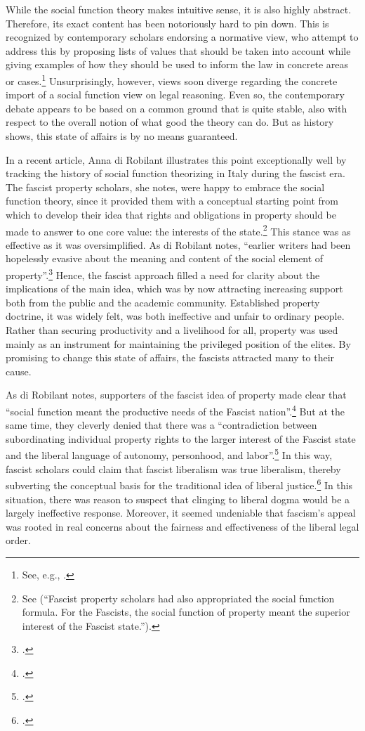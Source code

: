 While the social function theory makes intuitive sense, it is also highly abstract. Therefore, its exact content has been notoriously hard to pin down. This is recognized by contemporary scholars endorsing a normative view, who attempt to address this by proposing lists of values that should be taken into account while giving examples of how they should be used to inform the law in concrete areas or cases.\footnote{See, e.g., \cite{alexander14,alexander11,dagan07}.} Unsurprisingly, however, views soon diverge regarding the concrete import of a social function view on legal reasoning. Even so, the contemporary debate appears to be based on a common ground that is quite stable, also with respect to the overall notion of what good the theory can do. But as history shows, this state of affairs is by no means guaranteed. 

In a recent article, Anna di Robilant illustrates this point exceptionally well by tracking the history of social function theorizing in Italy during the fascist era. The fascist property scholars, she notes, were happy to embrace the social function theory, since it provided them with a conceptual starting point from which to develop their idea that rights and obligations in property should be made to answer to one core value: the interests of the state.\footnote{See \cite[908-909]{robilant13} (``Fascist property scholars had also appropriated the social function formula. For the Fascists, the social function of property meant the superior interest of the Fascist state.'').} This stance was as effective as it was oversimplified. As di Robilant notes, ``earlier writers had been hopelessly evasive about the meaning and content of the social element of property''.\footcite[909]{robilant13} Hence, the fascist approach filled a need for clarity about the implications of the main idea, which was by now attracting increasing support both from the public and the academic community. Established property doctrine, it was widely felt, was both ineffective and unfair to ordinary people. Rather than securing productivity and a livelihood for all, property was used mainly as an instrument for maintaining the privileged position of the elites. By promising to change this state of affairs, the fascists attracted many to their cause.

As di Robilant notes, supporters of the fascist idea of property made clear that ``social function meant the productive needs of the Fascist nation''.\footcite[909]{robilant13} But at the same time, they cleverly denied that there was a ``contradiction between subordinating individual property rights to the larger interest of the Fascist state and the liberal language of autonomy, personhood, and labor''.\footcite[900]{robilant13} In this way, fascist scholars could claim that fascist liberalism was true liberalism, thereby subverting the conceptual basis for the traditional idea of liberal justice.\footcite[900]{robilant13} In this situation, there was reason to suspect that clinging to liberal dogma would be a largely ineffective response. Moreover, it seemed undeniable that fascism's appeal was rooted in real concerns about the fairness and effectiveness of the liberal legal order. 

